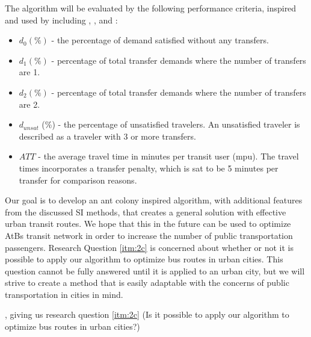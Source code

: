 The algorithm will be evaluated by the following performance criteria, inspired and used by including \citep{kechagiopoulos14}, \citep{mandl80}, \citep{nikolic14} and \citep{fan09}: 
\begin{itemize}
\item $d_0 (\%)$ - the percentage of demand satisfied without any transfers.
\item $d_1 (\%)$ - percentage of total transfer demands where the number of transfers are 1. 
\item $d_2 (\%)$ - percentage of total transfer demands where the number of transfers are 2. 
\item $d_{unsat}$ (\%) - the percentage of unsatisfied travelers. An unsatisfied traveler is described as a traveler with 3 or more transfers.
\item $ATT$  - the average travel time in minutes per transit user (mpu). The travel times incorporates a transfer penalty, which is sat to be 5 minutes per transfer for comparison reasons.
\end{itemize}

Our goal is to develop an ant colony inspired algorithm, with additional features from the discussed SI methods, that creates a general solution with effective urban transit routes. We hope that this in the future can be used to optimize AtBs transit network in order to increase the number of public transportation passengers. Research Question \vref{itm:2c} is concerned about whether or not it is possible to apply our algorithm to optimize bus routes in urban cities. This question cannot be fully answered until it is applied to an urban city, but we will strive to create a method that is easily adaptable with the concerns of public transportation in cities in mind.  

, giving us research question \vref{itm:2c} (Is it possible to apply our algorithm to optimize bus routes in urban cities?)
